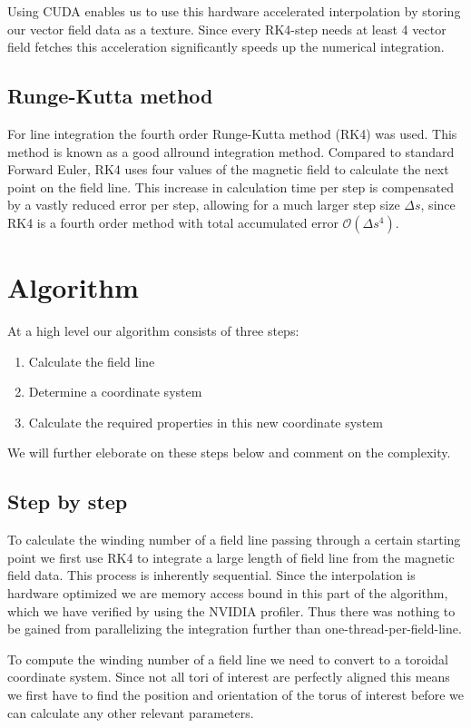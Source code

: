 \documentclass{article}
\renewcommand{\O}[1]{\ensuremath{\mathcal{O}\left(#1\right)}}
\begin{document}
Using CUDA enables us to use this hardware accelerated interpolation by storing our vector field data as a texture. Since every RK4-step needs at least 4 vector field fetches this acceleration significantly speeds up the numerical integration. %

\subsection{Runge-Kutta method}
For line integration the fourth order Runge-Kutta method (RK4) was used.  This method is known as a good allround integration method. Compared to standard Forward Euler, RK4 uses four values of the magnetic field to calculate the next point on the field line. This increase in calculation time per step is compensated by a vastly reduced error per step, allowing for a much larger step size $\Delta s$, since RK4 is a fourth order method with total accumulated error $\O{\Delta s^4}$.

\section{Algorithm}
At a high level our algorithm consists of three steps: 
\begin{enumerate}
	\item Calculate the field line
	\item Determine a coordinate system
	\item Calculate the required properties in this new coordinate system
\end{enumerate}
We will further eleborate on these steps below and comment on the complexity.\\

\subsection{Step by step}

To calculate the winding number of a field line passing through a certain starting point we first use RK4 to integrate a large length of field line from the magnetic field data. This process is inherently sequential.
Since the interpolation is hardware optimized we are memory access bound in this part of the algorithm, which we have verified by using the NVIDIA profiler. Thus there was nothing to be gained from parallelizing the integration further than one-thread-per-field-line.

To compute the winding number of a field line we need to convert to a toroidal coordinate system. Since not all tori of interest are perfectly aligned this means we first have to find the position and orientation of the torus of interest before we can calculate any other relevant parameters.
\end{document}
